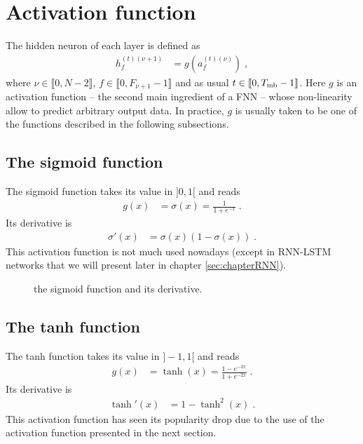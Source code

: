 \section{Activation function}

The hidden neuron of each layer is defined as
\begin{align}
h_{f}^{(t)(\nu+1)}&=g\left(a_{f}^{(t)(\nu)}\right)\;,
\end{align}
where $\nu\in\llbracket 0,N-2\rrbracket$, $f\in \llbracket 0,F_{\nu+1}-1\rrbracket$ and as usual $t \in \llbracket0,T_{{\rm mb}}-1\rrbracket$. Here $g$ is an activation function -- the second main ingredient of a FNN -- whose non-linearity allow to predict arbitrary output data. In practice, $g$ is usually taken to be one of the functions described in the following subsections.


\subsection{The sigmoid function}

The sigmoid function takes its value in $]0,1[$ and reads
\begin{align}
g(x)&=\sigma(x)=\frac{1}{1+e^{-x}}\;.
\end{align}
Its derivative is
\begin{align}
\sigma'(x)&=\sigma(x)\left(1-\sigma(x)\right)\;.
\end{align}
This activation function is not much used nowadays (except in RNN-LSTM networks that we will present later in chapter \ref{sec:chapterRNN}).

\begin{figure}[H]
\begin{center}
\end{center}
\caption{\label{fig:sigmoid} the sigmoid function and its derivative.}
\end{figure}

\subsection{The tanh function}

The tanh function takes its value in $]-1,1[$ and reads
\begin{align}
g(x)&=\tanh(x)=\frac{1-e^{-2x}}{1+e^{-2x}}\;.
\end{align}
Its derivative is
\begin{align}
\tanh'(x)&=1-\tanh^2(x)\;.
\end{align}
This activation function has seen its popularity drop due to the use of the activation function presented in the next section.

